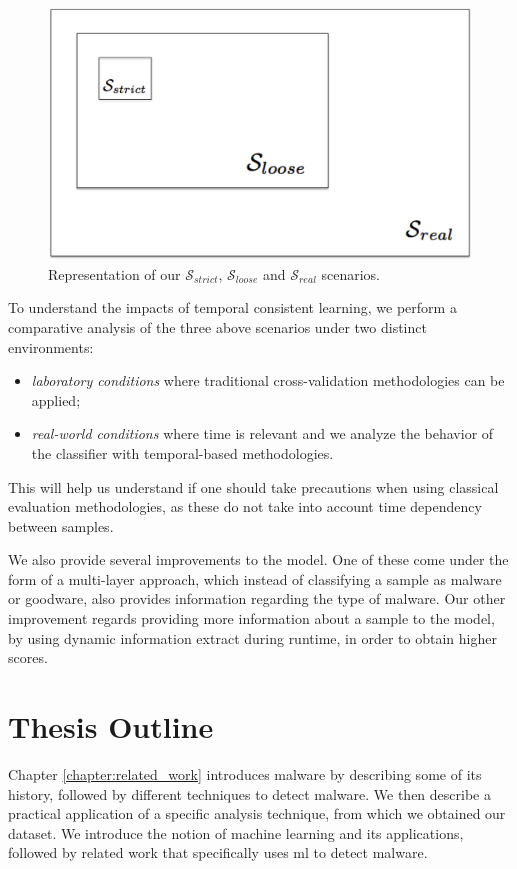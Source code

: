 \begin{figure}[!h]
	\centering
	\includegraphics[width=0.7\columnwidth]{Figures/dataset_sizes.png}
	\caption{Representation of our $\mathcal{S}_{strict}$, $\mathcal{S}_{loose}$ and $\mathcal{S}_{real}$ scenarios.}
	\label{fig:scenarios}
\end{figure}

To understand the impacts of temporal consistent learning, we perform a comparative analysis of the three above scenarios under two distinct environments:

\begin{itemize}
	\item \textit{laboratory conditions} where traditional cross-validation methodologies can be applied;
	\item \emph{real-world conditions} where time is relevant and we analyze the behavior of the classifier with temporal-based methodologies.
\end{itemize}

This will help us understand if one should take precautions when using classical evaluation methodologies, as these do not take into account time dependency between samples.

We also provide several improvements to the model.
One of these come under the form of a multi-layer approach, which instead of classifying a sample as malware or goodware, also provides information regarding the type of malware.
Our other improvement regards providing more information about a sample to the model, by using dynamic information extract during runtime, in order to obtain higher scores.

\section{Thesis Outline}
\label{section:outline}

Chapter \ref{chapter:related_work} introduces malware by describing some of its history, followed by different techniques to detect malware. We then describe a practical application of a specific analysis technique, from which we obtained our dataset.
We introduce the notion of machine learning and its applications, followed by related work that specifically uses \gls{ml} to detect malware. 

